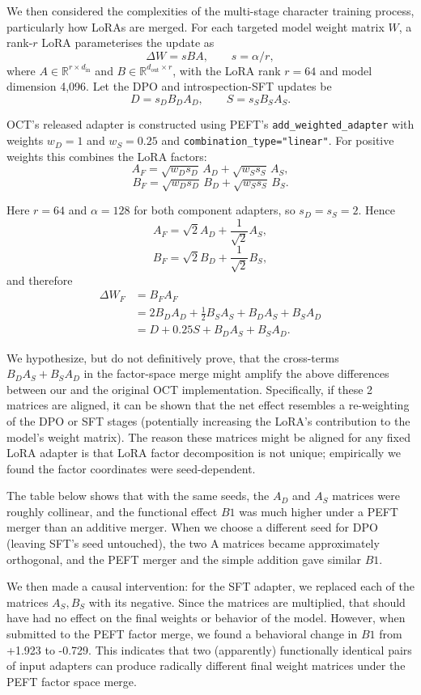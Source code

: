 \documentclass[11pt]{article}
\begin{document}
We then considered the complexities of the multi-stage character training process, particularly how LoRAs are merged. For each targeted model weight matrix $W$, a rank-$r$ LoRA parameterises the update as
\[
\Delta W = sBA, \qquad s=\alpha/r,
\]
where $A\in\mathbb{R}^{r\times d_{\mathrm{in}}}$ and
$B\in\mathbb{R}^{d_{\mathrm{out}}\times r}$, with the LoRA rank $r=64$ and model dimension 4,096.  Let the DPO and
introspection-SFT updates be
\[
D=s_D B_DA_D,\qquad S=s_S B_SA_S.
\]

OCT's released adapter is constructed using PEFT's
\texttt{add\_weighted\_adapter} with weights $w_D=1$ and $w_S=0.25$
and \texttt{combination\_type="linear"}.  For positive weights this
combines the LoRA factors:
\[
A_F=
\sqrt{w_Ds_D}\,A_D+\sqrt{w_Ss_S}\,A_S,
\]
\[
B_F=
\sqrt{w_Ds_D}\,B_D+\sqrt{w_Ss_S}\,B_S.
\]

Here $r=64$ and $\alpha=128$ for both component adapters, so
$s_D=s_S=2$. Hence
\[
A_F=\sqrt{2}A_D+\frac{1}{\sqrt{2}}A_S,
\]
\[
B_F=\sqrt{2}B_D+\frac{1}{\sqrt{2}}B_S,
\]
and therefore
\[
\begin{aligned}
\Delta W_F
&=B_FA_F\\
&=2B_DA_D+\frac{1}{2}B_SA_S+B_DA_S+B_SA_D\\
&=D+0.25S+B_DA_S+B_SA_D.
\end{aligned}
\]

We hypothesize, but do not definitively prove, that the cross-terms $B_DA_S + B_SA_D$ in the factor-space merge might amplify the above differences between our and the original OCT implementation. Specifically, if these 2 matrices are aligned, it can be shown that the net effect resembles a re-weighting of the DPO or SFT stages (potentially increasing the LoRA's contribution to the model's weight matrix). The reason these matrices might be aligned for any fixed LoRA adapter is that LoRA factor decomposition is not unique; empirically we found the factor coordinates were seed-dependent. 

The table below shows that with the same seeds, the $A_D$ and $A_S$ matrices were roughly collinear, and the functional effect $B1$ was much higher under a PEFT merger than an additive merger. When we choose a different seed for DPO (leaving SFT's seed untouched), the two A matrices became approximately orthogonal, and the PEFT merger and the simple addition gave similar $B1$.

We then made a causal intervention: for the SFT adapter, we replaced each of the matrices $A_S, B_S$ with its negative. Since the matrices are multiplied, that should have had no effect on the final weights or behavior of the model. However, when submitted to the PEFT factor merge, we found a behavioral change in $B1$ from +1.923 to -0.729. This indicates that two (apparently) functionally identical pairs of input adapters can produce radically different final weight matrices under the PEFT factor space merge.
\end{document}

